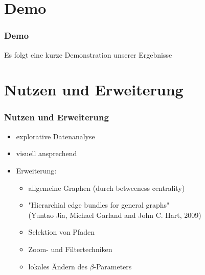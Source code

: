 \documentclass[11pt]{beamer}
\begin{document}
\section{Demo}
\begin{frame}
\frametitle{Demo}

Es folgt eine kurze Demonstration unserer Ergebnisse

\end{frame}


\section{Nutzen und Erweiterung}
\begin{frame}
\frametitle{Nutzen und Erweiterung}

\begin{itemize}
\item explorative Datenanalyse
\item visuell ansprechend
\item Erweiterung:
\begin{itemize} 
\item allgemeine Graphen (durch betweeness centrality)
\item "Hierarchial edge bundles for general graphs" 
\\(Yuntao Jia, Michael Garland and John C. Hart, 2009)
\item Selektion von Pfaden
\item Zoom- und Filtertechniken
\item lokales Ändern des $\beta$-Parameters 
\end{itemize}
\end{itemize}

\end{frame}
\end{document}

